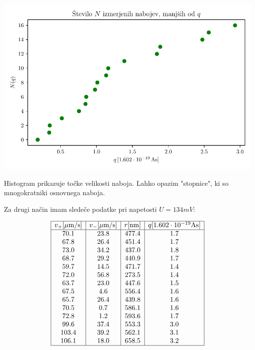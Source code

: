 \documentclass[12pt]{report}
\begin{document}
\begin{slika}[H]
  \centering
  \includegraphics{1metoda.pdf}
  \caption{\small Histogram prikazuje točke velikosti naboja. Lahko opazim "stopnice", ki so mnogokratniki osnovnega naboja.}
\end{slika}


Za drugi način imam sledeče podatke pri napetosti $U=134mV$:

\begin{tabela}[H]
  \centering
  \[
      \begin{array}{|c|c|c|c|} \hline
        v_+ [\si{\mu m/s}] & v_- [\si{\mu m/s}] & r[\si{nm}]& q [1.602 \cdot 10^{-19} \si{As}] \\ \hline 
        70.1 &    23.8 &   477.4 &     1.7\\
        67.8 &    26.4 &   451.4 &     1.7\\
        73.0 &    34.2 &   437.0 &     1.8\\
        68.7 &    29.2 &   440.9 &     1.7\\
        59.7 &    14.5 &   471.7 &     1.4\\
        72.0 &    56.8 &   273.5 &     1.4\\
        63.7 &    23.0 &   447.6 &     1.5\\
        67.5 &     4.6 &   556.4 &     1.6\\
        65.7 &    26.4 &   439.8 &     1.6\\
        70.5 &     0.7 &   586.1 &     1.6\\
        72.8 &     1.2 &   593.6 &     1.7\\
        99.6 &    37.4 &   553.3 &     3.0\\
       103.4 &    39.2 &   562.1 &     3.1\\
       106.1 &    18.0 &   658.5 &     3.2 \\ \hline 
      \end{array}
  \]
\end{tabela}
\end{document}
